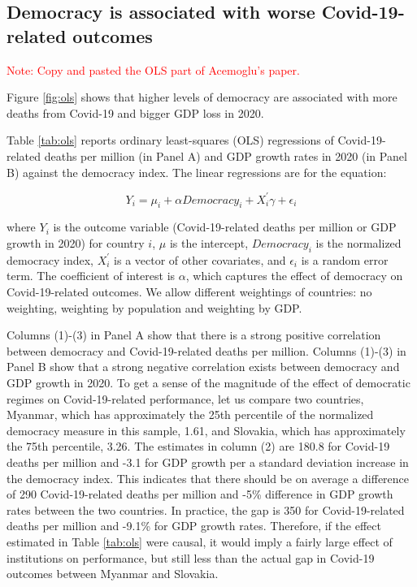 \subsection{Democracy is associated with worse Covid-19-related outcomes}

\textcolor{red}{Note: Copy and pasted the OLS part of Acemoglu's paper.}

Figure \ref{fig:ols} shows that higher levels of democracy are associated with more deaths from Covid-19 and bigger GDP loss in 2020. 

Table \ref{tab:ols} reports ordinary least-squares (OLS) regressions of Covid-19-related deaths per million (in Panel A) and GDP growth rates in 2020 (in Panel B) against the democracy index. The linear regressions are for the equation: 
    
    \begin{equation}
    \label{eqn:ols}
        Y_i = \mu_i + \alpha Democracy_i +  X^{'}_i \gamma + \epsilon_i
    \end{equation}
    
\noindent where $Y_i$ is the outcome variable (Covid-19-related deaths per million or GDP growth in 2020) for country $i$, $\mu$ is the intercept, $Democracy_i$ is the normalized democracy index, $X^{'}_i$ is a vector of other covariates, and $\epsilon_i$ is a random error term. The coefficient of interest is $\alpha$, which captures the effect of democracy on Covid-19-related outcomes. We allow different weightings of countries: no weighting, weighting by population and weighting by GDP. 

Columns (1)-(3) in Panel A show that there is a strong positive correlation between democracy and Covid-19-related deaths per million. Columns (1)-(3) in Panel B show that a strong negative correlation exists between democracy and GDP growth in 2020. To get a sense of the magnitude of the effect of democratic regimes on Covid-19-related performance, let us compare two countries, Myanmar, which has approximately the 25th percentile of the normalized democracy measure in this sample, 1.61, and Slovakia, which has approximately the 75th percentile, 3.26. The estimates in column (2) are 180.8 for Covid-19 deaths per million and -3.1 for GDP growth per a standard deviation increase in the democracy index. This indicates that there should be on average a difference of 290 Covid-19-related deaths per million and -5\% difference in GDP growth rates between the two countries. In practice, the gap is 350 for Covid-19-related deaths per million and -9.1\% for GDP growth rates. Therefore, if the effect estimated in Table \ref{tab:ols} were causal, it would imply a fairly large effect of institutions on performance, but still less than the actual gap in Covid-19 outcomes between Myanmar and Slovakia. 

